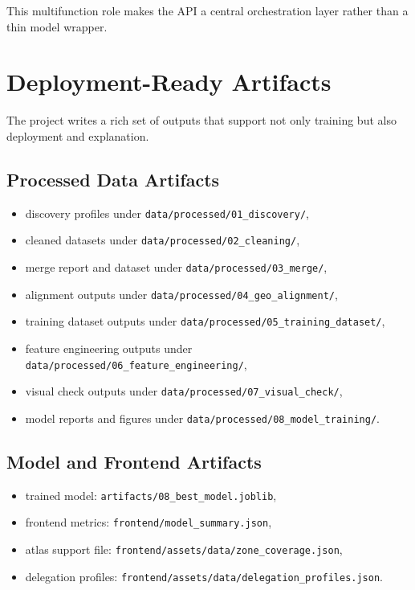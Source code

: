 \documentclass[11pt,a4paper]{article}
\newcommand{\code}[1]{\texttt{#1}}
\begin{document}
This multifunction role makes the API a central orchestration layer rather than a thin model wrapper.

\section{Deployment-Ready Artifacts}

The project writes a rich set of outputs that support not only training but also deployment and explanation.

\subsection{Processed Data Artifacts}

\begin{itemize}
\item discovery profiles under \code{data/processed/01\_discovery/},
\item cleaned datasets under \code{data/processed/02\_cleaning/},
\item merge report and dataset under \code{data/processed/03\_merge/},
\item alignment outputs under \code{data/processed/04\_geo\_alignment/},
\item training dataset outputs under \code{data/processed/05\_training\_dataset/},
\item feature engineering outputs under \code{data/processed/06\_feature\_engineering/},
\item visual check outputs under \code{data/processed/07\_visual\_check/},
\item model reports and figures under \code{data/processed/08\_model\_training/}.
\end{itemize}

\subsection{Model and Frontend Artifacts}

\begin{itemize}
\item trained model: \code{artifacts/08\_best\_model.joblib},
\item frontend metrics: \code{frontend/model\_summary.json},
\item atlas support file: \code{frontend/assets/data/zone\_coverage.json},
\item delegation profiles: \code{frontend/assets/data/delegation\_profiles.json}.
\end{itemize}
\end{document}
